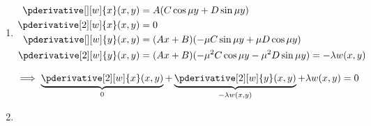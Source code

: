 
\begin{solution}

\phantom{}

\begin{enumerate}[label = (\roman*)]

    \item

    \begin{align*}
        \pderivative[][w]{x}(x, y)
        & =
        A (C \cos{\mu y} + D \sin{\mu y}) \\
        \pderivative[2][w]{x}(x, y)
        & = 0 \\
        \pderivative[][w]{y}(x, y)
        & =
        (Ax + B) (-\mu C \sin{\mu y} + \mu D \cos{\mu y}) \\
        \pderivative[2][w]{y}(x, y)
        & =
        (Ax + B) (-\mu^2 C \cos{\mu y} - \mu^2 D \sin{\mu y})
        =
        -\lambda w(x, y)
    \end{align*}

    \begin{align*}
        \implies
        \underbrace
        {
            \pderivative[2][w]{x}(x, y)
        }_0
        +
        \underbrace
        {
            \pderivative[2][w]{y}(x, y)
        }_{
            -\lambda w(x, y)
        }
        +
        \lambda w(x, y) = 0
    \end{align*}

    \item
    

\end{enumerate}
\end{solution}
